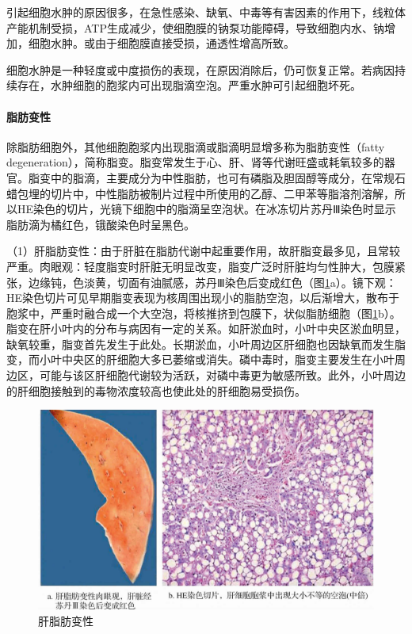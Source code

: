 引起细胞水肿的原因很多，在急性感染、缺氧、中毒等有害因素的作用下，线粒体产能机制受损，ATP生成减少，使细胞膜的钠泵功能障碍，导致细胞内水、钠增加，细胞水肿。或由于细胞膜直接受损，通透性增高所致。

细胞水肿是一种轻度或中度损伤的表现，在原因消除后，仍可恢复正常。若病因持续存在，水肿细胞的胞浆内可出现脂滴空泡。严重水肿可引起细胞坏死。

\paragraph{脂肪变性}
除脂肪细胞外，其他细胞胞浆内出现脂滴或脂滴明显增多称为脂肪变性（fatty
degeneration），简称脂变。脂变常发生于心、肝、肾等代谢旺盛或耗氧较多的器官。脂变中的脂滴，主要成分为中性脂肪，也可有磷脂及胆固醇等成分，在常规石蜡包埋的切片中，中性脂肪被制片过程中所使用的乙醇、二甲苯等脂溶剂溶解，所以HE染色的切片，光镜下细胞中的脂滴呈空泡状。在冰冻切片苏丹Ⅲ染色时显示脂肪滴为橘红色，锇酸染色时呈黑色。

（1）肝脂肪变性：由于肝脏在脂肪代谢中起重要作用，故肝脂变最多见，且常较严重。肉眼观：轻度脂变时肝脏无明显改变，脂变广泛时肝脏均匀性肿大，包膜紧张，边缘钝，色淡黄，切面有油腻感，苏丹Ⅲ染色后变成红色（图\ref{fig1-8}a）。镜下观：HE染色切片可见早期脂变表现为核周围出现小的脂肪空泡，以后渐增大，散布于胞浆中，严重时融合成一个大空泡，将核推挤到包膜下，状似脂肪细胞（图\ref{fig1-8}b）。脂变在肝小叶内的分布与病因有一定的关系。如肝淤血时，小叶中央区淤血明显，缺氧较重，脂变首先发生于此处。长期淤血，小叶周边区肝细胞也因缺氧而发生脂变，而小叶中央区的肝细胞大多已萎缩或消失。磷中毒时，脂变主要发生在小叶周边区，可能与该区肝细胞代谢较为活跃，对磷中毒更为敏感所致。此外，小叶周边的肝细胞接触到的毒物浓度较高也使此处的肝细胞易受损伤。
\begin{figure}[!htbp]
	\centering
	\includegraphics{./images/Image00009.jpg}
	\caption{肝脂肪变性}
	\label{fig1-8}
\end{figure}



